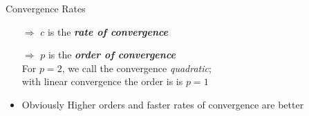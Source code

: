 \documentclass[11pt,compress,t,notes=noshow, xcolor=table]{beamer}
\begin{document}
\begin{vbframe}{Convergence Rates}
\begin{comment}
    \item \textbf{Superlinear Convergence:} there is a sequence $c^{[t]} \to 0, c^{[t]}\ge 0 $, such that
  $$ \|\xv^{[t+1]}- \xv^\ast\| \leq c^{[t]}\|\xv^{[t]}-\xv^\ast\| $$

  \item \textbf{Convergence of order $p$:} convergence of $(\xv^{[t]})_{t \in\N}$ to $\xv^\ast$ is of order $p>1$ if there exists a $c>0$, such that
    $$ \|\xv^{[t+1]}-\xv^\ast\| \leq c\|\xv^{[t]}-\xv^\ast\|^p $$
\end{itemize}
\end{comment}

\framebreak

\begin{itemize}
    \item[$\Rightarrow$] $c$ is the \emph{\bfseries rate of convergence}\\[10pt]
    \item[$\Rightarrow$] $p$ is the \emph{\bfseries order of convergence}\\[5pt]
    For $p=2$, we call the convergence \emph{quadratic};\\ with linear convergence the order is is $p=1$\\[20pt]
    
\item Obviously Higher orders and faster rates of convergence are better 

\end{itemize}


\end{vbframe}
\end{document}
